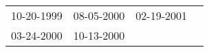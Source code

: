\begin{supertabular}{llll}
 10-20-1999 &  08-05-2000 &  02-19-2001 \\
 03-24-2000 &  10-13-2000 &             \\
\end{supertabular}
